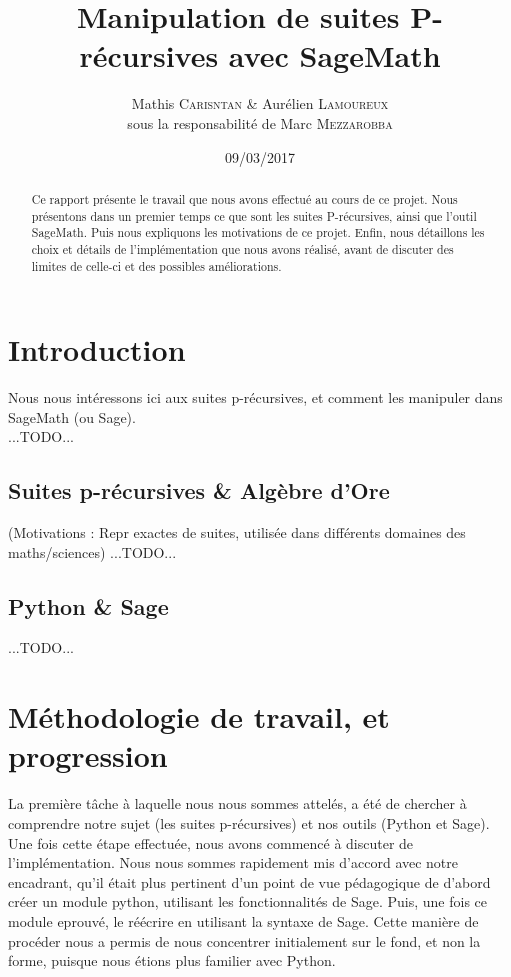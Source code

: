 \documentclass[final,12pt]{article}
\begin{document}
%
\title{Manipulation de suites P-récursives avec SageMath}
\author{Mathis \textsc{Carisntan} \& Aurélien \textsc{Lamoureux} \\ {\small sous la responsabilité de Marc \textsc{Mezzarobba}}}
%
\date{09/03/2017}

\maketitle
%
\begin{abstract}
    Ce rapport présente le travail que nous avons effectué au cours de ce projet.
    Nous présentons dans un premier temps ce que sont les suites P-récursives,
    ainsi que l'outil SageMath. Puis nous expliquons les motivations de ce projet.
    Enfin, nous détaillons les choix et détails de l'implémentation que nous avons réalisé,
    avant de discuter des limites de celle-ci et des possibles améliorations.
\end{abstract}

\section{Introduction}
    \label{sec:intro}
    Nous nous intéressons ici aux suites p-récursives, et comment les manipuler dans SageMath (ou Sage). \\
    {\color{red} ...TODO...}
    \subsection{Suites p-récursives \& Algèbre d'Ore}
        (Motivations : Repr exactes de suites, utilisée dans différents domaines des maths/sciences)
        \label{ssec:prec}
        {\color{red} ...TODO...}
    \subsection{Python \& Sage}
        \label{ssec:sage}
        {\color{red} ...TODO...}

\section{Méthodologie de travail, et progression}
    \label{sec:methodo}
    La première tâche à laquelle nous nous sommes attelés, a été de chercher à comprendre notre sujet
    (les suites p-récursives) et nos outils (Python et Sage). Une fois cette étape effectuée, nous avons
    commencé à discuter de l'implémentation. Nous nous sommes rapidement mis d'accord avec notre encadrant,
    qu'il était plus pertinent d'un point de vue pédagogique de d'abord créer un module python,
    utilisant les fonctionnalités de Sage. Puis, une fois ce module eprouvé, le réécrire 
    en utilisant la syntaxe de Sage. Cette manière de procéder nous a permis de nous concentrer initialement
    sur le fond, et non la forme, puisque nous étions plus familier avec Python.
\end{document}
